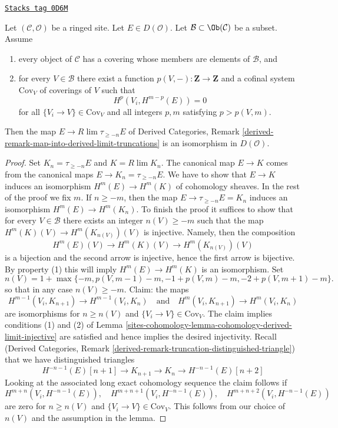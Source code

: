 \begin{lemma}
\label{sites-cohomology-lemma-is-limit-per-object}
\href{https://stacks.math.columbia.edu/tag/0D6M}{\texttt{Stacks tag 0D6M}}

Let $(\mathcal{C}, \mathcal{O})$ be a ringed site. Let $E \in D(\mathcal{O})$.
Let $\mathcal{B} \subset \Ob(\mathcal{C})$ be a subset. Assume
\begin{enumerate}
\item every object of $\mathcal{C}$ has a covering whose members
are elements of $\mathcal{B}$, and
\item for every $V \in \mathcal{B}$ there exist a function
$p(V, -) : \mathbf{Z} \to \mathbf{Z}$ and a cofinal system $\text{Cov}_V$
of coverings of $V$ such that
$$
H^p(V_i, H^{m - p}(E)) = 0
$$
for all $\{V_i \to V\} \in \text{Cov}_V$ and all integers $p, m$
satisfying $p > p(V, m)$.
\end{enumerate}
Then the map $E \to R\lim \tau_{\geq -n} E$ of
Derived Categories, Remark
\ref{derived-remark-map-into-derived-limit-truncations}
is an isomorphism in $D(\mathcal{O})$.
\end{lemma}

\begin{proof}
Set $K_n = \tau_{\geq -n}E$ and $K = R\lim K_n$.
The canonical map $E \to K$
comes from the canonical maps $E \to K_n = \tau_{\geq -n}E$.
We have to show that $E \to K$ induces an isomorphism
$H^m(E) \to H^m(K)$ of cohomology sheaves. In the rest of the
proof we fix $m$. If $n \geq -m$, then
the map $E \to \tau_{\geq -n}E = K_n$ induces an isomorphism
$H^m(E) \to H^m(K_n)$.
To finish the proof it suffices to show that for every $V \in \mathcal{B}$
there exists an integer $n(V) \geq -m$ such that the map
$H^m(K)(V) \to H^m(K_{n(V)})(V)$ is injective. Namely, then
the composition
$$
H^m(E)(V) \to H^m(K)(V) \to H^m(K_{n(V)})(V)
$$
is a bijection and the second arrow is injective, hence the
first arrow is bijective. By property (1) this will imply
$H^m(E) \to H^m(K)$ is an isomorphism. Set
$$
n(V) = 1 + \max\{-m, p(V, m - 1) - m, -1 + p(V, m) - m, -2 + p(V, m + 1) - m\}.
$$
so that in any case $n(V) \geq -m$. Claim: the maps
$$
H^{m - 1}(V_i, K_{n + 1}) \to H^{m - 1}(V_i, K_n)
\quad\text{and}\quad
H^m(V_i, K_{n + 1}) \to H^m(V_i, K_n)
$$
are isomorphisms for $n \geq n(V)$ and $\{V_i \to V\} \in \text{Cov}_V$.
The claim implies conditions
(1) and (2) of Lemma \ref{sites-cohomology-lemma-cohomology-derived-limit-injective}
are satisfied and hence implies the desired injectivity.
Recall (Derived Categories, Remark
\ref{derived-remark-truncation-distinguished-triangle})
that we have distinguished triangles
$$
H^{-n - 1}(E)[n + 1] \to
K_{n + 1} \to K_n \to H^{-n - 1}(E)[n + 2]
$$
Looking at the associated long exact cohomology sequence the claim follows if
$$
H^{m + n}(V_i, H^{-n - 1}(E)),\quad
H^{m + n + 1}(V_i, H^{-n - 1}(E)),\quad
H^{m + n + 2}(V_i, H^{-n - 1}(E))
$$
are zero for $n \geq n(V)$ and $\{V_i \to V\} \in \text{Cov}_V$.
This follows from our choice of $n(V)$
and the assumption in the lemma.
\end{proof}

